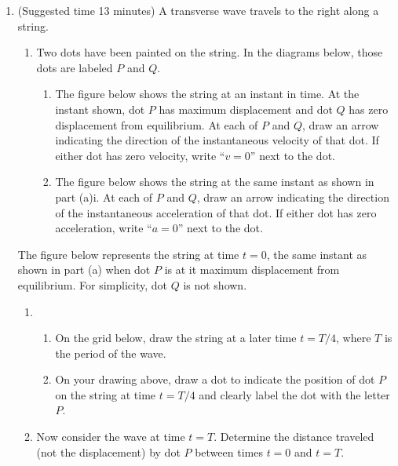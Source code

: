 \documentclass{../../../oss-classkick}
\begin{document}
\begin{enumerate}[leftmargin=15pt]
\item (Suggested time 13 minutes) A transverse wave travels to the right
  along a string.
  \begin{enumerate}[leftmargin=18pt]
  \item  Two dots have been painted on the string. In the diagrams below, those
    dots are labeled $P$ and $Q$.
    \begin{enumerate}[leftmargin=12pt]
    \item The figure below shows the string at an instant in time. At the
      instant shown, dot $P$ has maximum displacement and dot $Q$ has zero
      displacement from equilibrium. At each of $P$ and $Q$, draw an
      arrow indicating the direction of the instantaneous velocity of that dot.
      If either dot has zero velocity, write ``$v=0$'' next to the dot.
      \begin{center}
      \end{center}
    \item The figure below shows the string at the same instant as shown in
      part (a)i. At each of $P$ and $Q$, draw an arrow indicating the
      direction of the instantaneous acceleration of that dot. If either dot
      has zero acceleration, write ``$a=0$'' next to the dot.
      \begin{center}
      \end{center}
    \end{enumerate}
  \end{enumerate}
  The figure below represents the string at time $t=0$, the same instant as
  shown in part (a) when dot $P$ is at it maximum displacement from
  equilibrium. For simplicity, dot $Q$ is not shown.
  \begin{center}
  \end{center}
  \begin{enumerate}[leftmargin=18pt,resume]
  \item 
    \begin{enumerate}[leftmargin=18pt]
    \item On the grid below, draw the string at a later time $t=T/4$, where
      $T$ is the period of the wave.
      \begin{center}
  \end{center}
    \item On your drawing above, draw a dot to indicate the position of dot
      $P$ on the string at time $t=T/4$ and clearly label the dot with the
      letter $P$.
    \end{enumerate}
  \item Now consider the wave at time $t=T$. Determine the distance traveled
    (not the displacement) by dot $P$ between times $t=0$ and $t=T$.
    \vspace{1in}
  \end{enumerate}
  \newpage
  

\end{enumerate}
\end{document}
